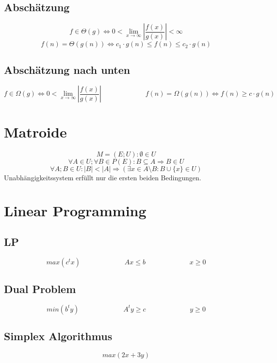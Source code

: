 \documentclass[10pt,a4paper]{article}
\newcommand{\abs}[1]{\ensuremath{\left\vert#1\right\vert}}
\begin{document}
\subsection{Abschätzung}
\[f \in \Theta(g) \Leftrightarrow 0 <\lim_{x \rightarrow \infty} \abs{\frac{f(x)}{g(x)}} < \infty \]
\[f(n) = \Theta(g(n)) \Leftrightarrow c_1 \cdot g(n) \leq f(n) \leq c_2 \cdot g(n)\]
\subsection{Abschätzung nach unten}
\[f \in \Omega(g) \Leftrightarrow 0 < \lim_{x \rightarrow \infty} \abs{\frac{f(x)}{g(x)}} \,\,\,\,\,\,\,\,\,\,\,\,\,\,\,\,\,\,\,\,\,\,\,\,\,\,\,\,\,\,\,\,\,\,\,\,\,\,\, f(n) = \Omega(g(n)) \Leftrightarrow f(n) \geq c \cdot g(n) \]
\section{Matroide}
\[
M = (E;U) : \emptyset \in U
\]
\[\forall A \in U; \forall B \in P(E) : B \subseteq A \Rightarrow B \in U\]
\[ \forall A;B \in U: |B| < |A| \Rightarrow (\exists x \in A \setminus B : B \cup \lbrace x \rbrace \in U) \]
Unabhängigkeitssystem erfüllt nur die ersten beiden Bedingungen.
\section{Linear Programming}
\subsection{LP}
\[max(c^t x)\,\,\,\,\,\,\,\,\,\,\,\,\,\,\,\,\,\,\,\,\,\,\,\,\,\,\,\,\,\,\,\,\,\,\,\,\,\,\,
Ax \leq b\,\,\,\,\,\,\,\,\,\,\,\,\,\,\,\,\,\,\,\,\,\,\,\,\,\,\,\,\,\,\,\,\,\,\,\,\,\,\,
x \geq 0\]
\subsection{Dual Problem}
\[min(b^t y)\,\,\,\,\,\,\,\,\,\,\,\,\,\,\,\,\,\,\,\,\,\,\,\,\,\,\,\,\,\,\,\,\,\,\,\,\,\,\,
A^t y \geq c\,\,\,\,\,\,\,\,\,\,\,\,\,\,\,\,\,\,\,\,\,\,\,\,\,\,\,\,\,\,\,\,\,\,\,\,\,\,\,
y \geq 0\]
\subsection{Simplex Algorithmus}
\[max(2x+3y)\]
\end{document}
